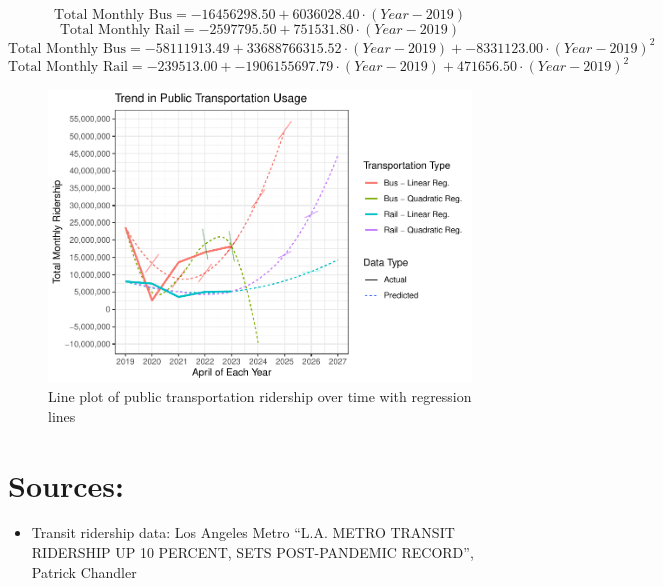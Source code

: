 \documentclass[
]{article}
\providecommand{\tightlist}{%
  \setlength{\itemsep}{0pt}\setlength{\parskip}{0pt}}
\begin{document}
\[ \text{Total\ Monthly\ Bus} = -16456298.50 + 6036028.40 \cdot (Year - 2019) \]\[ \text{Total\ Monthly\ Rail} = -2597795.50 + 751531.80 \cdot (Year - 2019) \]\[ \text{Total\ Monthly\ Bus} = -58111913.49 + 33688766315.52 \cdot (Year - 2019) + -8331123.00 \cdot (Year - 2019)^2 \]\[ \text{Total\ Monthly\ Rail} = -239513.00 + -1906155697.79 \cdot (Year - 2019) + 471656.50 \cdot (Year - 2019)^2 \]

\begin{figure}
\centering
\includegraphics{Paper_files/figure-latex/plot-trend-usage-1.pdf}
\caption{Line plot of public transportation ridership over time with
regression lines}
\end{figure}

\newpage

\hypertarget{sources}{%
\section{Sources:}\label{sources}}

\begin{itemize}
\tightlist
\item
  Transit ridership data: Los Angeles Metro ``L.A. METRO TRANSIT
  RIDERSHIP UP 10 PERCENT, SETS POST-PANDEMIC RECORD'', Patrick Chandler
\end{itemize}
\end{document}
